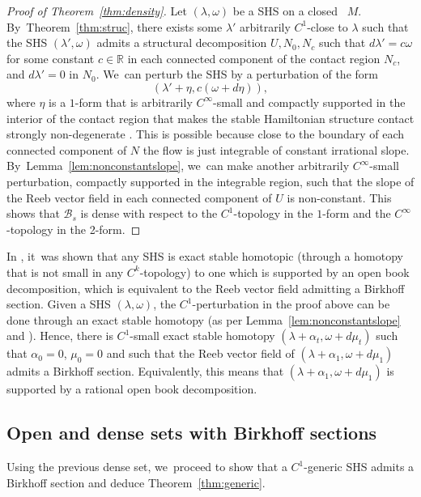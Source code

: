 \begin{proof}[Proof of Theorem~\ref{thm:density}]
Let $(\lambda,\omega)$ be a SHS on a closed \threemanifold~$M$. By~Theorem~\ref{thm:struc}, there exists some $\lambda'$ arbitrarily $C^1$-close to $\lambda$ such that the SHS $(\lambda',\omega)$ admits a structural decomposition $U, N_0, N_c$ such that $d\lambda'=c\omega$ for some constant $c\in \mathbb{R}$ in each connected component of the contact region $N_c$, and $d\lambda'=0$ in $N_0$. We~can perturb the SHS by a perturbation of the form
\[
(\lambda'+ \eta, c(\omega+d\eta)),
\]
where $\eta$ is a $1$-form that is arbitrarily $C^\infty$-small and compactly supported in the interior of the contact region that makes the stable Hamiltonian structure contact strongly non-degenerate \cite{CM, Ro, Pe}. This is possible because close to the boundary of each connected component of $N$ the flow is just integrable of constant irrational slope. By~Lemma~\ref{lem:nonconstantslope}, we~can make another arbitrarily $C^\infty$-small perturbation, compactly supported in the integrable region, such that the slope of the Reeb vector field in each connected component of $U$ is non-constant. This shows that $\mathcal{B}_s$ is dense with respect to the $C^1$-topology in the $1$-form and the $C^\infty$-topology in the 2-form.
\end{proof}

\begin{Remark}\label{rm:rat}
In \cite{CV0}, it~was shown that any SHS is exact stable homotopic (through a homotopy that is not small in any $C^k$-topology) to one which is supported by an open book decomposition, which is equivalent to the Reeb vector field admitting a Birkhoff section. Given a SHS $(\lambda, \omega)$, the $C^1$-perturbation in the proof above can be done through an exact stable homotopy (as per Lemma~\ref{lem:nonconstantslope} and \cite[Th.\,4.6]{CV1}). Hence, there is $C^1$-small exact stable homotopy $(\lambda+\alpha_t, \omega+ d\mu_t)$ such that $\alpha_0=0$, $\mu_0=0$ and such that the Reeb vector field of $(\lambda+\alpha_1, \omega+d\mu_1)$ admits a Birkhoff section. Equivalently, this means that $(\lambda+\alpha_1,\omega+d\mu_1)$ is supported by a rational open book decomposition.
\end{Remark}

\subsection{Open and dense sets with Birkhoff sections}
Using the previous dense set, we~proceed to show that a $C^1$-generic SHS admits a Birkhoff section and deduce Theorem~\ref{thm:generic}.

